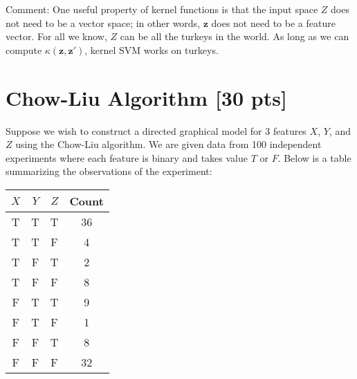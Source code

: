 \documentclass[a4paper]{article}
\theoremstyle{definition}
\begin{document}
Comment: One useful property of kernel functions is that the input space $Z$ does not need to be a vector space; in
other words, $\mathbf z$ does not need to be a feature vector. For all we know, $Z$ can be all the turkeys in the world. As long as we
can compute $\kappa(\mathbf z, \mathbf z')$, kernel SVM works on turkeys.

\section{Chow-Liu Algorithm [30 pts]}
Suppose we wish to construct a directed graphical model for 3 features $X$, $Y$, and $Z$ using the Chow-Liu algorithm. We are given data from 100 independent experiments where each feature is binary and takes value $T$ or $F$. Below is a table summarizing the observations of the experiment:

\begin{table}[H]
        \centering
                \begin{tabular}{cccc}
                           $X$ & $Y$ & $Z$ & Count \\
                                \hline
                                T & T & T & 36 \\
                                \hline
                                T & T & F & 4 \\
                                \hline
                                T & F & T & 2 \\
                                \hline
                                T & F & F & 8 \\
                                \hline
                                F & T & T & 9 \\
                                \hline
                                F & T & F & 1 \\
                                \hline
                                F & F & T & 8 \\
                                \hline
                                F & F & F & 32 \\
                                \hline
                \end{tabular}
\end{table}
\end{document}
